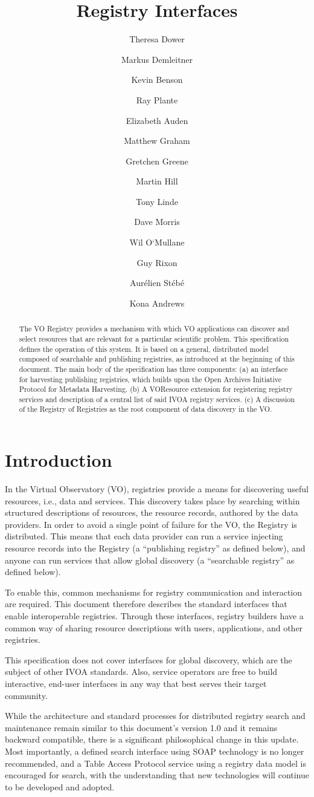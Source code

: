 \documentclass{ivoa}
\author{Theresa Dower}
\author{Markus Demleitner}
\author{Kevin Benson}
\author{Ray Plante}
\author{Elizabeth Auden}
\author{Matthew Graham}
\author{Gretchen Greene}
\author{Martin Hill}
\author{Tony Linde}
\author{Dave Morris}
\author{Wil O`Mullane}
\author{Guy Rixon}
\author{Aur\'elien St\'eb\'e}
\author{Kona Andrews}
\title{Registry Interfaces}
\begin{document}
\begin{abstract}
The VO Registry provides a mechanism with which VO applications can
discover and select resources that are relevant for a particular
scientific problem. This specification defines the operation of this
system. It is based on a general, distributed model composed of
searchable and publishing registries, as introduced at the beginning of
this document. The main body of the specification has three components:
(a) an interface for harvesting publishing registries, which builds upon
the Open Archives Initiative Protocol for Metadata Harvesting.  (b) A
VOResource extension for registering registry services and description
of a central list of said IVOA registry services.  (c) A discussion of
the Registry of Registries as the root component of data discovery in
the VO.
\end{abstract}


\section{Introduction}

\label{introduction}

In the Virtual Observatory (VO), registries provide a means for
discovering useful resources, i.e., data and services.  This discovery
takes place by searching within structured descriptions of resources,
the resource records, authored by the data providers.  In order to avoid
a single point of failure for the VO, the Registry is distributed.
This means that each data provider can run a service injecting
resource records into the Registry (a ``publishing registry'' as defined
below), and anyone can run services that allow global discovery (a
``searchable registry'' as defined below).

To enable this, common mechanisms for registry communication and
interaction are required.
This document therefore describes the standard interfaces that enable
interoperable registries.  Through these interfaces, registry
builders have a common way of sharing resource descriptions with users,
applications, and other registries.

This specification does not cover interfaces for global discovery, which
are the subject of other IVOA standards.  Also, service operators are
free to build interactive, end-user interfaces in
any way that best serves their target community.

While the architecture and standard processes for distributed registry
search and maintenance remain similar to this document's version 1.0 and
it remains backward compatible, there is a significant philosophical
change in this update. Most importantly, a defined search interface
using SOAP technology is no longer recommended, and a Table Access 
Protocol service using a registry data model is encouraged for search, with the
understanding that new technologies will continue to be developed and adopted.
\end{document}
